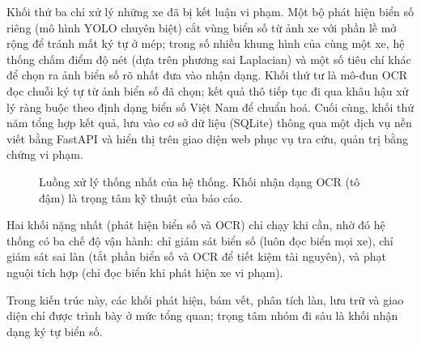 \documentclass[12pt,a4paper]{report}
\begin{document}
Khối thứ ba chỉ xử lý những xe đã bị kết luận vi phạm. Một bộ phát hiện biển số riêng (mô hình YOLO chuyên biệt) cắt vùng biển số từ ảnh xe với phần lề mở rộng để tránh mất ký tự ở mép; trong số nhiều khung hình của cùng một xe, hệ thống chấm điểm độ nét (dựa trên phương sai Laplacian) và một số tiêu chí khác để chọn ra ảnh biển số rõ nhất đưa vào nhận dạng. Khối thứ tư là mô-đun OCR đọc chuỗi ký tự từ ảnh biển số đã chọn; kết quả thô tiếp tục đi qua khâu hậu xử lý ràng buộc theo định dạng biển số Việt Nam để chuẩn hoá. Cuối cùng, khối thứ năm tổng hợp kết quả, lưu vào cơ sở dữ liệu (SQLite) thông qua một dịch vụ nền viết bằng FastAPI và hiển thị trên giao diện web phục vụ tra cứu, quản trị bằng chứng vi phạm.

\begin{figure}[H]
\centering
{}
\caption{Luồng xử lý thống nhất của hệ thống. Khối nhận dạng OCR (tô đậm) là trọng tâm kỹ thuật của báo cáo.}
\label{fig:pipeline}
\end{figure}

Hai khối nặng nhất (phát hiện biển số và OCR) chỉ chạy khi cần, nhờ đó hệ thống có ba chế độ vận hành: chỉ giám sát biển số (luôn đọc biển mọi xe), chỉ giám sát sai làn (tắt phần biển số và OCR để tiết kiệm tài nguyên), và phạt nguội tích hợp (chỉ đọc biển khi phát hiện xe vi phạm).

Trong kiến trúc này, các khối phát hiện, bám vết, phân tích làn, lưu trữ và giao diện chỉ được trình bày ở mức tổng quan; trọng tâm nhóm đi sâu là khối nhận dạng ký tự biển số.

\end{document}
